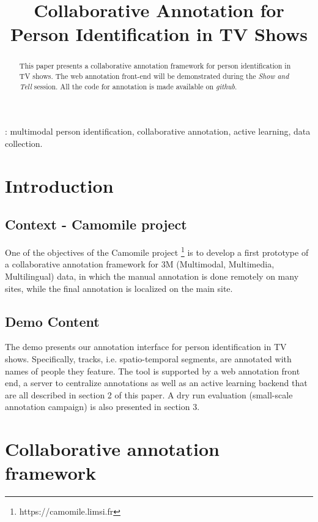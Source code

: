 \documentclass[a4paper]{article}
\title{Collaborative Annotation for Person Identification in TV Shows}
\begin{document}
  \maketitle
  \begin{abstract}
This paper presents a collaborative annotation framework for person identification in TV shows. The web annotation front-end will be demonstrated during the \textit{Show and Tell} session. All the code for annotation is made available on \textit{github}.
  \end{abstract}
  : multimodal person identification, collaborative annotation, active learning, data collection.

  \section{Introduction}
      \subsection{Context - Camomile project}
One of the objectives of the Camomile project \footnote{https://camomile.limsi.fr} is to develop a first prototype of a collaborative annotation framework for 3M (Multimodal, Multimedia, Multilingual) data, in which the manual annotation is done remotely on many sites, while the final annotation is localized on the main site. 

        \vspace{-0.2cm}
 \subsection{Demo Content}
The demo presents our annotation interface for person identification in TV shows. Specifically, tracks, i.e. spatio-temporal segments, are annotated with names of people they feature. The tool is supported by a web annotation front end, a server to centralize annotations as well as an active learning backend that are all described in section 2 of this paper. A dry run evaluation (small-scale annotation campaign) is also presented in section 3.


      \section{Collaborative annotation framework}
\end{document}
